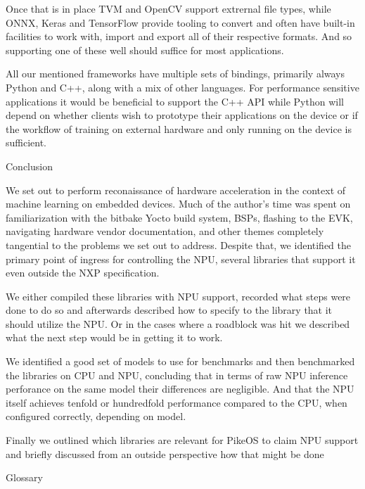 Once that is in place TVM and OpenCV support extrernal
file types,
while ONNX, Keras and TensorFlow
provide tooling to convert and
often have built-in facilities to work with,
import and export
all of their respective formats.
And so supporting one of these well should
suffice for most applications.

All our mentioned frameworks have multiple sets of bindings,
primarily always Python and C++, along with a mix of other languages.
For performance sensitive applications it would be beneficial
to support the C++ API while Python will depend on
whether clients wish to prototype their applications
on the device or if the workflow
of training on external hardware and only running on the device
is sufficient.

\chap Conclusion

We set out to perform reconaissance of
hardware acceleration
in the context of machine learning on embedded devices.
Much of the author's time was spent
on familiarization with the bitbake Yocto build system,
BSPs,
flashing to the EVK,
navigating hardware vendor documentation,
and other themes completely tangential
to the problems we set out to address.
Despite that, we identified the primary
point of ingress for controlling the NPU,
several libraries that support it
even outside the NXP specification.

We either compiled these libraries with NPU support,
recorded what steps were done to do so
and afterwards described how to specify to the library
that it should utilize the NPU.
Or in the cases where a roadblock was hit
we described what the next step would
be in getting it to work.

We identified a good set of models to use for benchmarks
and then benchmarked the libraries on CPU and NPU,
concluding that in terms of raw NPU
inference perforance on the same model
their differences are negligible.
And that the NPU itself achieves
tenfold or hundredfold performance compared to the CPU,
when configured correctly,
depending on model.

Finally we outlined which libraries are relevant
for PikeOS to claim NPU support
and briefly discussed from an outside perspective
how that might be done 


\app Glossary

